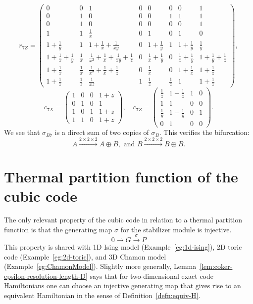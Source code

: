 \[
r_{7Z} =
\left(\begin{array}{cccccccc}
 0 & 0 & 1 & 0 & 0 & 0 & 0 & 1 \\
 0 & 1 & 0 & 0 & 0 & 1 & 1 & 1 \\
 0 & 1 & 0 & 0 & 0 & 0 & 0 & 1 \\
 1 & 1 & \frac{1}{x} & 0 & 1 & 0 & 1 & 0 \\
 1+\frac{1}{y} & 1 & 1+\frac{1}{x}+\frac{1}{x y} & 0 & 1+\frac{1}{y} & 1 & 1+\frac{1}{y} & \frac{1}{y} \\
 1+\frac{1}{x}+\frac{1}{y} & \frac{1}{x} & \frac{1}{x^2}+\frac{1}{x}+\frac{1}{x y}+\frac{1}{z} & 0 & \frac{1}{x}+\frac{1}{y} & 0 & \frac{1}{x}+\frac{1}{y} & 1+\frac{1}{y}+\frac{1}{z} \\
 1+\frac{1}{x} & \frac{1}{x} & \frac{1}{x^2}+\frac{1}{x}+\frac{1}{z} & 0 & \frac{1}{x} & 0 & 1+\frac{1}{x} & 1+\frac{1}{z} \\
 1+\frac{1}{z} & \frac{1}{z} & \frac{1}{x z} & 1 & \frac{1}{z} & \frac{1}{z} & 1 & 1+\frac{1}{z}
\end{array}\right),
\]
\[
 c_{7X} =
\left(\begin{array}{cccc}
 1 & 0 & 0 & 1+z \\
 0 & 1 & 0 & 1 \\
 1 & 0 & 1 & 1+z \\
 1 & 1 & 0 & 1+z
\end{array}\right),\quad
c_{7Z} =
\left(\begin{array}{cccc}
 \frac{1}{z} & 1+\frac{1}{z} & 1 & 0 \\
 1 & 1 & 0 & 0 \\
 \frac{1}{y} & 1+\frac{1}{y} & 0 & 1 \\
 0 & 1 & 0 & 0
\end{array}\right).
\]
We see that $\sigma_{B7}$ is a direct sum of two copies of $\sigma_B$.
This verifies the bifurcation:
\[
 A \xrightarrow{2\times 2 \times 2} A \oplus B, \text{ and } B \xrightarrow{2 \times 2 \times 2} B \oplus B.
\]

\section{Thermal partition function of the cubic code}
\label{sec:thermal-partition-function}

The only relevant property of the cubic code in relation to a thermal partition function
is that the generating map $\sigma$ for the stabilizer module is injective.
\[
 0 \to G \xrightarrow{\sigma} P
\]
This property is shared with 1D Ising model (Example~\ref{eg:1d-ising}),
2D toric code (Example~\ref{eg:2d-toric}), and 3D Chamon model (Example~\ref{eg:ChamonModel}).
Slightly more generally, Lemma~\ref{lem:coker-epsilon-resolution-length-D} says that
for two-dimensional exact code Hamiltonians one can choose an injective generating map 
that gives rise to an equivalent Hamiltonian in the sense of Definition~\ref{defn:equiv-H}.

